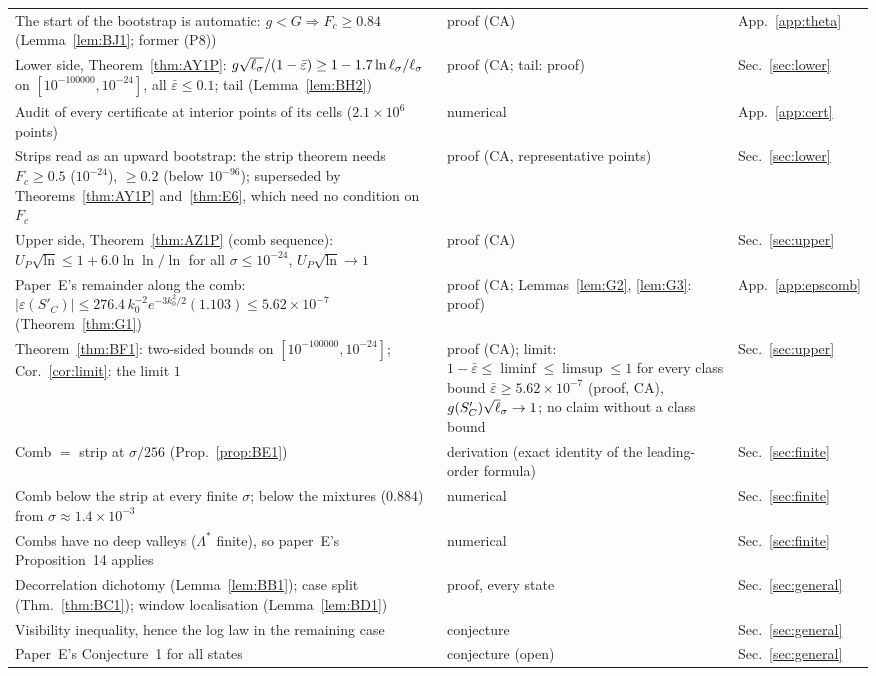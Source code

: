 \begin{table}
\begin{ruledtabular}
\begin{tabular}{p{}p{}l}
The start of the bootstrap is automatic: $g<G\Rightarrow F_c\ge0.84$ (Lemma~\ref{lem:BJ1}; former (P8)) & proof (CA) & App.~\ref{app:theta}\\
Lower side, Theorem~\ref{thm:AY1P}: $g\sqrt{\ell_\sigma}/(1-\bar\varepsilon)\ge1-1.7\ln\ell_\sigma/\ell_\sigma$ on $[10^{-100000},10^{-24}]$, all $\bar\varepsilon\le0.1$; tail (Lemma~\ref{lem:BH2}) & proof (CA; tail: proof) & Sec.~\ref{sec:lower}\\
Audit of every certificate at interior points of its cells ($2.1\times10^6$ points) & numerical & App.~\ref{app:cert}\\
Strips read as an upward bootstrap: the strip theorem needs $F_c\ge0.5$ ($10^{-24}$), $\ge0.2$ (below $10^{-96}$); superseded by Theorems~\ref{thm:AY1P} and~\ref{thm:E6}, which need no condition on $F_c$ & proof (CA, representative points) & Sec.~\ref{sec:lower}\\
Upper side, Theorem~\ref{thm:AZ1P} (comb sequence): $U_P\sqrt{\ln}\le1+6.0\ln\ln/\ln$ for all $\sigma\le10^{-24}$, $U_P\sqrt{\ln}\to1$ & proof (CA) & Sec.~\ref{sec:upper}\\
Paper~E's remainder along the comb: $|\varepsilon(S'_C)|\le276.4\,k_0^{-2}e^{-3k_0^2/2}(1.103)\le5.62\times10^{-7}$ (Theorem~\ref{thm:G1}) & proof (CA; Lemmas~\ref{lem:G2}, \ref{lem:G3}: proof) & App.~\ref{app:epscomb}\\
Theorem~\ref{thm:BF1}: two-sided bounds on $[10^{-100000},10^{-24}]$; Cor.~\ref{cor:limit}: the limit $1$ & proof (CA); limit: $1-\bar\varepsilon\le\liminf\le\limsup\le1$ for every class bound $\bar\varepsilon\ge5.62\times10^{-7}$ (proof, CA), $g(S'_C)\sqrt\ls\to1$; no claim without a class bound & Sec.~\ref{sec:upper}\\
Comb $=$ strip at $\sigma/256$ (Prop.~\ref{prop:BE1}) & derivation (exact identity of the leading-order formula) & Sec.~\ref{sec:finite}\\
Comb below the strip at every finite $\sigma$; below the mixtures ($0.884$) from $\sigma\approx1.4\times10^{-3}$ & numerical & Sec.~\ref{sec:finite}\\
Combs have no deep valleys ($\Lambda^*$ finite), so paper~E's Proposition~14 applies & numerical & Sec.~\ref{sec:finite}\\
Decorrelation dichotomy (Lemma~\ref{lem:BB1}); case split (Thm.~\ref{thm:BC1}); window localisation (Lemma~\ref{lem:BD1}) & proof, every state & Sec.~\ref{sec:general}\\
Visibility inequality, hence the log law in the remaining case & conjecture & Sec.~\ref{sec:general}\\
Paper~E's Conjecture~1 for all states & conjecture (open) & Sec.~\ref{sec:general}\\
\end{tabular}
\end{ruledtabular}
\end{table}
